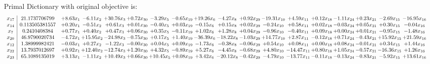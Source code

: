 \documentclass[9pt]{article}
\begin{document}
Primal Dictionary with original objective is:
\[\begin{array}{c| c c@{\hskip 2pt} c@{\hskip 2pt} c@{\hskip 2pt} c@{\hskip 2pt} c@{\hskip 2pt} c@{\hskip 2pt} c@{\hskip 2pt} c@{\hskip 2pt} c@{\hskip 2pt} c@{\hskip 2pt} c@{\hskip 2pt} c@{\hskip 2pt} c@{\hskip 2pt} c@{\hskip 2pt} c@{\hskip 2pt} c@{\hskip 2pt} }
 x_{17}   &  21.1737706799 & +  8.63 x_{1} & -6.11 x_{2} & + 30.76 x_{3} & +  0.72 x_{30} & -3.29 x_{5} & -0.65 x_{19} & + 19.26 x_{6} & -4.27 x_{8} & +  0.92 x_{29} & -19.31 x_{10} & +  4.59 x_{11} & +  0.12 x_{18} & -1.11 x_{24} & +  0.23 x_{21} & -2.69 x_{15} & -16.95 x_{16}\\
 x_{14}   &  0.113505381557 & +  0.20 x_{1} & -0.51 x_{2} & +  0.61 x_{3} & +  0.01 x_{30} & -0.40 x_{5} & +  0.03 x_{19} & -0.15 x_{6} & +  0.15 x_{8} & +  0.02 x_{29} & -0.24 x_{10} & +  0.58 x_{11} & +  0.02 x_{18} & -0.03 x_{24} & +  0.05 x_{21} & +  0.30 x_{15} & -0.04 x_{16}\\
 x_{7}   &  0.2410408384 & +  0.77 x_{1} & +  0.40 x_{2} & +  0.47 x_{3} & +  0.06 x_{30} & +  0.35 x_{5} & -0.11 x_{19} & +  1.02 x_{6} & +  1.28 x_{8} & +  0.04 x_{29} & -0.96 x_{10} & -0.40 x_{11} & +  0.09 x_{18} & +  0.00 x_{24} & +  0.01 x_{21} & -0.95 x_{15} & -1.48 x_{16}\\
 x_{20}   &  46.9790020734 & -4.72 x_{1} & + 15.95 x_{2} & -24.98 x_{3} & -0.75 x_{30} & +  0.17 x_{5} & +  1.40 x_{19} & -36.39 x_{6} & -18.22 x_{8} & -1.03 x_{29} & + 14.77 x_{10} & +  2.87 x_{11} & -0.12 x_{18} & +  0.71 x_{24} & -0.43 x_{21} & + 15.92 x_{15} & + 21.59 x_{16}\\
 x_{12}   &  1.38999982421 & -0.03 x_{1} & +  0.27 x_{2} & -1.22 x_{3} & -0.00 x_{30} & +  0.04 x_{5} & +  0.09 x_{19} & -1.73 x_{6} & -0.38 x_{8} & -0.06 x_{29} & +  0.54 x_{10} & +  0.08 x_{11} & +  0.00 x_{18} & +  0.08 x_{24} & -0.01 x_{21} & +  0.34 x_{15} & +  1.44 x_{16}\\
 x_{22}   &  13.7937012697 & +  0.92 x_{1} & + 12.40 x_{2} & -12.74 x_{3} & +  1.20 x_{30} & +  4.32 x_{5} & -0.89 x_{19} & +  5.27 x_{6} & -4.45 x_{8} & -0.68 x_{29} & +  4.80 x_{10} & -14.47 x_{11} & +  0.80 x_{18} & +  1.05 x_{24} & -0.57 x_{21} & -16.36 x_{15} & +  1.26 x_{16}\\
 x_{23}   &  65.1089135019 & +  3.13 x_{1} & -1.11 x_{2} & + 10.49 x_{3} & +  0.66 x_{30} & + 10.45 x_{5} & +  0.08 x_{19} & +  3.42 x_{6} & -20.12 x_{8} & -0.42 x_{29} & -4.79 x_{10} & -13.77 x_{11} & -0.11 x_{18} & -0.13 x_{24} & -0.83 x_{21} & -5.92 x_{15} & + 13.61 x_{16}\\

\end{array}\]
\end{document}
